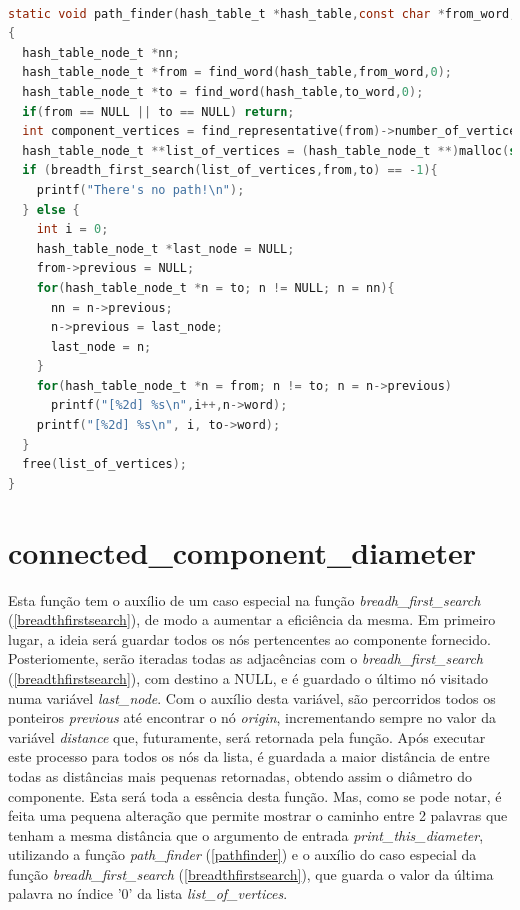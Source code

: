 	\begin{lstlisting}[language=C]

static void path_finder(hash_table_t *hash_table,const char *from_word,const char *to_word)
{
  hash_table_node_t *nn;
  hash_table_node_t *from = find_word(hash_table,from_word,0);
  hash_table_node_t *to = find_word(hash_table,to_word,0);
  if(from == NULL || to == NULL) return;
  int component_vertices = find_representative(from)->number_of_vertices;
  hash_table_node_t **list_of_vertices = (hash_table_node_t **)malloc(sizeof(hash_table_node_t) * component_vertices);
  if (breadth_first_search(list_of_vertices,from,to) == -1){
    printf("There's no path!\n");
  } else {
    int i = 0;
    hash_table_node_t *last_node = NULL;
    from->previous = NULL;
    for(hash_table_node_t *n = to; n != NULL; n = nn){
      nn = n->previous;
      n->previous = last_node;
      last_node = n;
    }
    for(hash_table_node_t *n = from; n != to; n = n->previous)
      printf("[%2d] %s\n",i++,n->word);
    printf("[%2d] %s\n", i, to->word);
  }
  free(list_of_vertices);
}
	\end{lstlisting}
	
	\section{connected\_component\_diameter}
	\label{connectedcomponentdiameter}
Esta função tem o auxílio de um caso especial na função \textit{breadh\_first\_search} (\ref{breadthfirstsearch}), de modo a aumentar a eficiência
da mesma. Em primeiro lugar, a ideia será guardar todos os nós pertencentes ao componente fornecido.
Posteriomente, serão iteradas todas as adjacências com o \textit{breadh\_first\_search} (\ref{breadthfirstsearch}), com destino a NULL, e é guardado o último nó visitado 
numa variável \textit{last\_node}. Com o auxílio desta variável, são percorridos todos os ponteiros \textit{previous} até encontrar o nó \textit{origin}, incrementando 
sempre no valor da variável \textit{distance} que, futuramente, será retornada pela função. Após executar este processo para todos os nós da lista, é guardada a maior distância de entre todas as distâncias mais pequenas retornadas, obtendo assim o diâmetro do componente.
Esta será toda a essência desta função. Mas, como se pode notar, é feita uma pequena alteração que permite mostrar o caminho entre 2 palavras
que tenham a mesma distância que o argumento de entrada \textit{print\_this\_diameter}, utilizando a função \textit{path\_finder} (\ref{pathfinder}) e o auxílio do caso especial da função \textit{breadh\_first\_search} (\ref{breadthfirstsearch}), que 
guarda o valor da última palavra no índice '0' da lista \textit{list\_of\_vertices}.	
	
